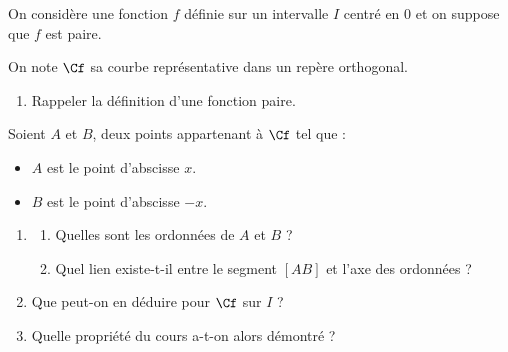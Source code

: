 \begin{exo}{}
	On considère une fonction $f$ définie sur un intervalle $I$ centré en $0$ et on suppose que $f$ est paire.


	On note $\Cf$ sa courbe représentative dans un repère orthogonal.
	\begin{enumerate}
		\item Rappeler la définition d'une fonction paire.
	\end{enumerate}


	Soient $A$ et $B$, deux points appartenant à $\Cf$ tel que :
	\begin{itemize}
		\item $A$ est le point d'abscisse $x$.
		\item $B$ est le point d'abscisse $-x$.
	\end{itemize}
	\begin{enumerate}[resume]
		\item \begin{enumerate}
			      \item Quelles sont les ordonnées de $A$ et $B$ ?
			      \item Quel lien existe-t-il entre le segment $[AB]$ et l'axe des ordonnées ?
		      \end{enumerate}
		\item Que peut-on en déduire pour $\Cf$ sur $I$ ?
		\item Quelle propriété du cours a-t-on alors démontré ?
	\end{enumerate}
\end{exo}
